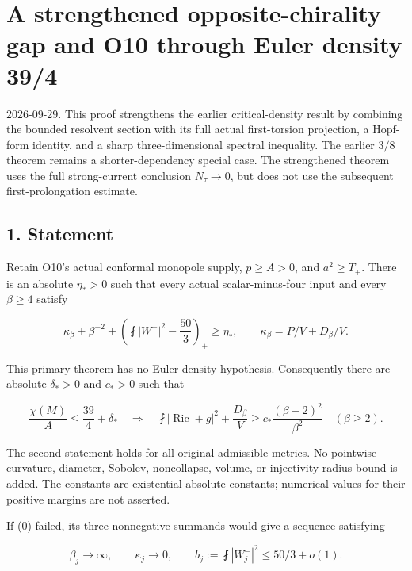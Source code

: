 \hypertarget{o10strength:a-strengthened-opposite-chirality-gap-and-o10-through-euler-density-394}{%
\section{A strengthened opposite-chirality gap and O10 through Euler
density
39/4}\label{o10strength:a-strengthened-opposite-chirality-gap-and-o10-through-euler-density-394}}

2026-09-29. This proof strengthens the earlier critical-density result
by combining the bounded resolvent section with its full actual
first-torsion projection, a Hopf-form identity, and a sharp
three-dimensional spectral inequality. The earlier \(3/8\) theorem
remains a shorter-dependency special case. The strengthened theorem uses
the full strong-current conclusion \(N_\tau\to0\), but does not use the
subsequent first-prolongation estimate.

\hypertarget{o10strength:statement}{%
\subsection{1. Statement}\label{o10strength:statement}}

Retain O10's actual conformal monopole supply, \(p\ge A>0\), and
\(a^2\ge T_+\). There is an absolute \(\eta_*>0\) such that every actual
scalar-minus-four input and every \(\beta\ge4\) satisfy

\[
 \boxed{\kappa_\beta+\beta^{-2}+
 \left(\fint|W^-|^2-\frac{50}{3}\right)_+\ge\eta_*},
 \qquad \kappa_\beta=P/V+D_\beta/V.
\tag{0}
\]

This primary theorem has no Euler-density hypothesis. Consequently there
are absolute \(\delta_*>0\) and \(c_*>0\) such that

\[
 \frac{\chi(M)}A\le\frac{39}{4}+\delta_*
 \quad\Longrightarrow\quad
 \boxed{\fint|\operatorname{Ric}+g|^2+\frac{D_\beta}V
 \ge c_*\frac{(\beta-2)^2}{\beta^2}\quad(\beta\ge2)}.
\tag{1}
\]

The second statement holds for all original admissible metrics. No
pointwise curvature, diameter, Sobolev, noncollapse, volume, or
injectivity-radius bound is added. The constants are existential
absolute constants; numerical values for their positive margins are not
asserted.

If (0) failed, its three nonnegative summands would give a sequence
satisfying

\[
 \beta_j\to\infty,\qquad\kappa_j\to0,\qquad
 b_j:=\fint|W_j^-|^2\le50/3+o(1).
\tag{2a}
\]

